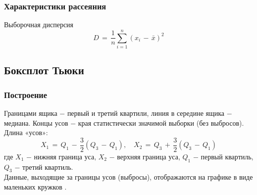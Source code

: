 \subsubsection{Характеристики рассеяния}
\begin{flushleft}
	Выборочная дисперсия
	\begin{equation}
		\label{14} D \,=\,\frac{1}{n}\displaystyle\sum_{i=1}^{n} (x_i \,-\, \bar{x})^2
	\end{equation}
\end{flushleft}

\subsection{Боксплот Тьюки}
\subsubsection{Построение}
\begin{flushleft}
	Границами ящика $-$ первый и третий квартили, линия в середине ящика $-$ медиана. Концы усов $-$ края статистически значимой выборки (без выбросов). Длина «усов»:
	\begin{equation}
		\label{15} X_1 \, =\, Q_1\,-\,\frac{3}{2}(Q_3\,-\, Q_1),\quad X_2\,=\, Q_3\,+\,\frac{3}{2}(Q_3\,-\, Q_1)
	\end{equation}
	где $X_1$ $-$ нижняя граница уса, $X_2$ $-$ верхняя граница уса, $Q_1$ $-$ первый квартиль, $Q_3$ $-$ третий квартиль. \\
	Данные, выходящие за границы усов (выбросы), отображаются на графике в виде маленьких кружков \cite{3}.
\end{flushleft}

